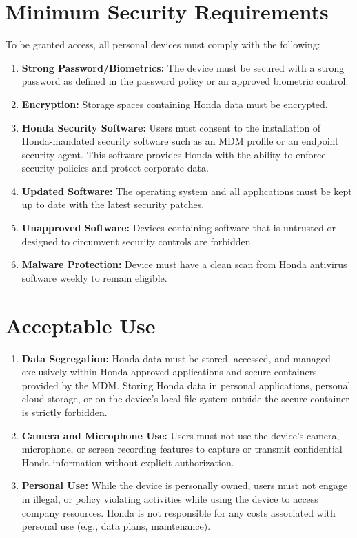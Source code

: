\section{Minimum Security Requirements}
To be granted access, all personal devices must comply with the following:
\begin{enumerate}
    \item \textbf{Strong Password/Biometrics:} The device must be secured with a strong password as defined in the password policy or an approved biometric control.
    \item \textbf{Encryption:} Storage spaces containing Honda data must be encrypted.
    \item \textbf{Honda Security Software:} Users must consent to the installation of Honda-mandated security software such as an MDM profile or an endpoint security agent.  This software provides Honda with the ability to enforce security policies and protect corporate data.
    \item \textbf{Updated Software:} The operating system and all applications must be kept up to date with the latest security patches.
    \item \textbf{Unapproved Software:} Devices containing software that is untrusted or designed to circumvent security controls are forbidden.
    \item \textbf{Malware Protection:} Device must have a clean scan from Honda antivirus software weekly to remain eligible.
\end{enumerate}
\section{Acceptable Use}
\begin{enumerate}
    \item \textbf{Data Segregation:} Honda data must be stored, accessed, and managed exclusively within Honda-approved applications and secure containers provided by the MDM.  Storing Honda data in personal applications, personal cloud storage, or on the device's local file system outside the secure container is strictly forbidden.
    \item \textbf{Camera and Microphone Use:} Users must not use the device's camera, microphone, or screen recording features to capture or transmit confidential Honda information without explicit authorization.
    \item \textbf{Personal Use:} While the device is personally owned, users must not engage in illegal, or policy violating activities while using the device to access company resources.  Honda is not responsible for any costs associated with personal use (e.g., data plans, maintenance).
\end{enumerate}
